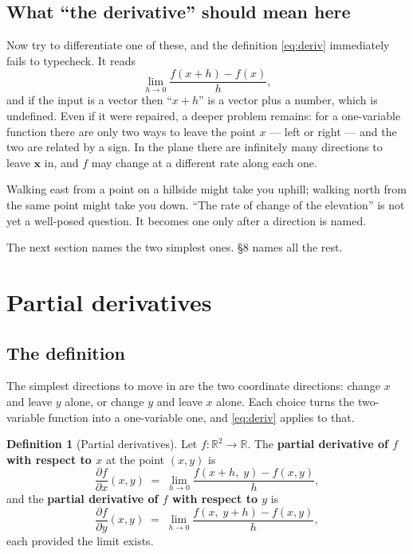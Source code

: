 \documentclass[11pt]{article}
\theoremstyle{plain}
\theoremstyle{definition}
\newtheorem{defn}{Definition}[section]
\theoremstyle{remark}
\newcommand{\R}{\mathbb{R}}
\newcommand{\vc}[1]{\mathbf{#1}}
\newcommand{\pd}[2]{\frac{\partial #1}{\partial #2}}
\begin{document}
\subsection{What ``the derivative'' should mean here}
Now try to differentiate one of these, and the definition \eqref{eq:deriv}
immediately fails to typecheck. It reads
\[
  \lim_{h\to0}\frac{f(x+h)-f(x)}{h} ,
\]
and if the input is a vector then ``$x+h$'' is a vector plus a number, which is
undefined. Even if it were repaired, a deeper problem remains: for a
one-variable function there are only two ways to leave the point $x$ --- left or
right --- and the two are related by a sign. In the plane there are infinitely
many directions to leave $\vc{x}$ in, and $f$ may change at a different rate
along each one.

Walking east from a point on a hillside might take you uphill; walking north from
the same point might take you down. ``The rate of change of the elevation'' is
not yet a well-posed question. It becomes one only after a direction is named.

The next section names the two simplest ones. \S8 names all the rest.

\section{Partial derivatives}

\subsection{The definition}
The simplest directions to move in are the two coordinate directions: change $x$
and leave $y$ alone, or change $y$ and leave $x$ alone. Each choice turns the
two-variable function into a one-variable one, and \eqref{eq:deriv} applies to
that.

\begin{defn}[Partial derivatives]
Let $f:\R^{2}\to\R$. The \textbf{partial derivative of $f$ with respect to $x$}
at the point $(x,y)$ is
\begin{equation}\label{eq:partialx}
  \pd{f}{x}(x,y) \;=\; \lim_{h\to0}\frac{f(x+h,\;y)-f(x,y)}{h},
\end{equation}
and the \textbf{partial derivative of $f$ with respect to $y$} is
\begin{equation}\label{eq:partialy}
  \pd{f}{y}(x,y) \;=\; \lim_{h\to0}\frac{f(x,\;y+h)-f(x,y)}{h},
\end{equation}
each provided the limit exists.
\end{defn}
\end{document}
